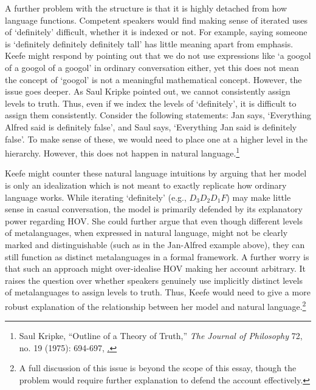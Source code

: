 A further problem with the structure is that it is highly detached from
how language functions. Competent speakers would find making sense of
iterated uses of `definitely' difficult, whether it is indexed or not.
For example, saying someone is `definitely definitely definitely tall'
has little meaning apart from emphasis. Keefe might respond by pointing
out that we do not use expressions like `a googol of a googol of a
googol' in ordinary conversation either, yet this does not mean the
concept of `googol' is not a meaningful mathematical concept. However,
the issue goes deeper. As Saul Kripke pointed out, we cannot
consistently assign levels to truth. Thus, even if we index the levels
of `definitely', it is difficult to assign them consistently. Consider
the following statements: Jan says, `Everything Alfred said is
definitely false', and Saul says, `Everything Jan said is definitely
false'. To make sense of these, we would need to place one at a higher
level in the hierarchy. However, this does not happen in natural
language.\footnote{Saul Kripke, ``Outline of a Theory of Truth,''
  \emph{The Journal of Philosophy} 72, no. 19 (1975): 694-697,
  \href{https://www.jstor.org/stable/2024634}.}

Keefe might counter these natural language intuitions by arguing that
her model is only an idealization which is not meant to exactly
replicate how ordinary language works. While iterating `definitely'
(e.g., \(D_{3}D_{2}D_{1}F\)) may make little sense in casual
conversation, the model is primarily defended by its explanatory power
regarding HOV. She could further argue that even though different levels
of metalanguages, when expressed in natural language, might not be
clearly marked and distinguishable (such as in the Jan-Alfred example
above), they can still function as distinct metalanguages in a formal
framework. A further worry is that such an approach might over-idealise
HOV making her account arbitrary. It raises the question over whether
speakers genuinely use implicitly distinct levels of metalanguages to
assign levels to truth. Thus, Keefe would need to give a more robust
explanation of the relationship between her model and natural
language.\footnote{A full discussion of this issue is beyond the scope
  of this essay, though the problem would require further explanation to
  defend the account effectively.}

